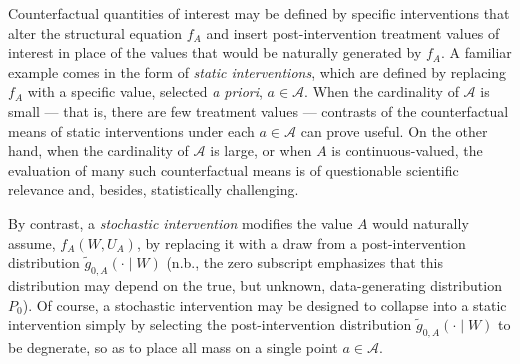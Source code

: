 Counterfactual quantities of interest may be defined by specific interventions
that alter the structural equation $f_A$ and insert post-intervention treatment
values of interest in place of the values that would be naturally generated by
$f_A$. A familiar example comes in the form of \textit{static interventions},
which are defined by replacing $f_A$ with a specific value, selected \textit{a
priori}, $a \in \mathcal{A}$. When the cardinality of $\mathcal{A}$ is small ---
that is, there are few treatment values --- contrasts of the counterfactual
means of static interventions under each $a \in \mathcal{A}$ can prove useful.
On the other hand, when the cardinality of $\mathcal{A}$ is large, or when $A$
is continuous-valued, the evaluation of many such counterfactual means is of
questionable scientific relevance and, besides, statistically challenging.


By contrast, a \textit{stochastic intervention} modifies the value $A$ would
naturally assume, $f_A(W, U_A)$, by replacing it with a draw from
a post-intervention distribution $\tilde{g}_{0,A}(\cdot \mid W)$ (n.b., the zero
subscript emphasizes that this distribution may depend on the true, but unknown,
data-generating distribution $P_0$). Of course, a stochastic intervention may be
designed to collapse into a static intervention simply by selecting the
post-intervention distribution $\tilde{g}_{0,A}(\cdot \mid W)$ to be degnerate,
so as to place all mass on a single point $a \in \mathcal{A}$.

